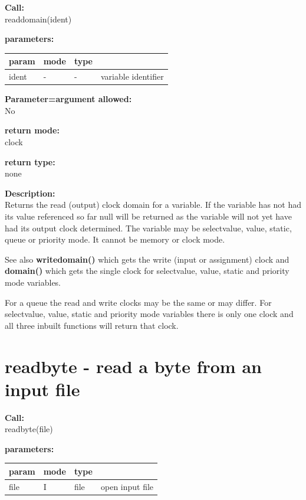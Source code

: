         {\bf Call:} \\
        readdomain(ident)
        
        {\bf parameters:} \\
        \begin{tabular}{| l | l | l | l |}
        \hline
        param  & mode & type & \\
        \hline \hline
        ident & - &  -  & variable identifier \\ \hline
        \end{tabular}
        
        {\bf Parameter=argument allowed:} \\
        No
        
        {\bf return mode:} \\
        clock

        {\bf return type:} \\
        none
        
        {\bf Description:} \\
        Returns the read (output) clock domain for a variable. If the variable
        has not had its value referenced so far null will be returned as the
        variable will not yet have had its output clock determined. The
        variable may be selectvalue, value, static, queue or priority mode.
        It cannot be memory or clock mode.
        
        See also {\bf writedomain()}  which gets the write
        (input or assignment) clock and {\bf domain()}  which
        gets the single clock for selectvalue, value, static and priority mode
        variables.
        
        For a queue the read and write clocks may be the same or may differ.
        For selectvalue, value, static and priority mode variables there is only
        one clock and all three inbuilt functions will return that clock.


    \section{readbyte - read a byte from an input file}\label{sec:ifreadbyte}
        
        {\bf Call:} \\
        readbyte(file)
        
        {\bf parameters:} \\
        \begin{tabular}{| l | l | l | l |}
        \hline
        param  & mode & type & \\
        \hline \hline
        file & I & file & open input file  \\ \hline
        \end{tabular}
        
